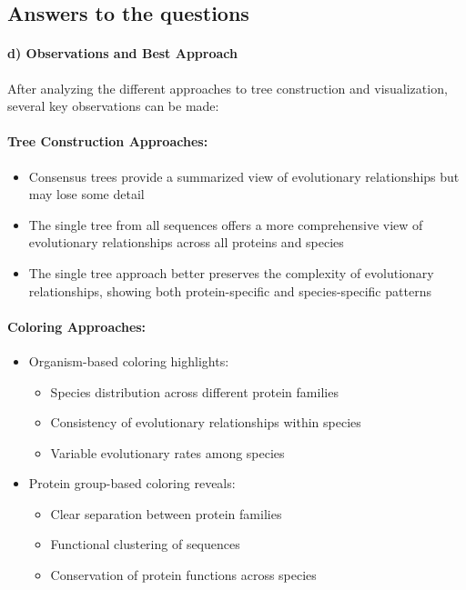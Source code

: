 \documentclass[11pt, a4paper, hidelinks]{article}
\begin{document}
\subsection{Answers to the questions}\label{subsec:answers-to-the-questions}

\paragraph{d) Observations and Best Approach}

After analyzing the different approaches to tree construction and visualization, several key observations can be made:

\paragraph{Tree Construction Approaches:}
\begin{itemize}
    \item Consensus trees provide a summarized view of evolutionary relationships but may lose some detail
    \item The single tree from all sequences offers a more comprehensive view of evolutionary relationships across all proteins and species
    \item The single tree approach better preserves the complexity of evolutionary relationships, showing both protein-specific and species-specific patterns
\end{itemize}

\paragraph{Coloring Approaches:}
\begin{itemize}
    \item Organism-based coloring highlights:
    \begin{itemize}
        \item Species distribution across different protein families
        \item Consistency of evolutionary relationships within species
        \item Variable evolutionary rates among species
    \end{itemize}
    \item Protein group-based coloring reveals:
    \begin{itemize}
        \item Clear separation between protein families
        \item Functional clustering of sequences
        \item Conservation of protein functions across species
    \end{itemize}
\end{itemize}
\end{document}
